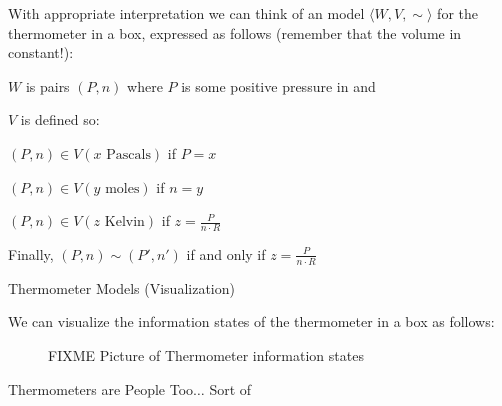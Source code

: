 \begin{itemizedot}
  \item With appropriate interpretation we can think of an  model
  $\langle W, V, \sim \rangle$ for the thermometer in a box, expressed as
  follows (remember that the volume in constant!):
  \begin{itemizedot}
    \item $W$ is pairs $(P, n)$ where $P$ is some positive pressure in
     and
    
    \item $V$ is defined so:
    \begin{itemizedot}
      \item $(P, n) \in V (x \text{ Pascals})$ if $P = x$
      
      \item $(P, n) \in V (y \text{ moles})$ if $n = y$
      
      \item $(P, n) \in V (z \text{ Kelvin})$ if $z = \frac{P}{n \cdot R}$
    \end{itemizedot}
    \item Finally, $(P, n) \sim (P', n')$ if and only if $z = \frac{P}{n \cdot
    R}$
  \end{itemizedot}
\end{itemizedot}
Thermometer Models (Visualization)
\begin{itemizedot}
  \item We can visualize the information states of the thermometer in a box as
  follows:
  
  \begin{figure}[h]
    FIXME Picture of Thermometer information states
    \caption{\label{thermometer-picture}}
  \end{figure}
\end{itemizedot}
Thermometers are People Too$\ldots$ Sort of

